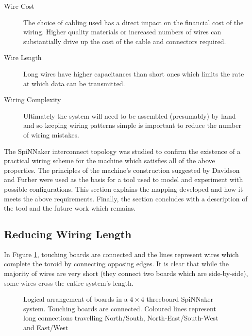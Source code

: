		\begin{description}
			
			\item[Wire Cost] The choice of cabling used has a direct impact on the
			financial cost of the wiring. Higher quality materials or increased
			numbers of wires can substantially drive up the cost of the cable and
			connectors required.
			
			\item[Wire Length] Long wires have higher capacitances than short ones
			which limits the rate at which data can be transmitted.
			
			\item[Wiring Complexity] Ultimately the system will need to be assembled
			(presumably) by hand and so keeping wiring patterns simple is important to
			reduce the number of wiring mistakes.
			
		\end{description}
		
		The SpiNNaker interconnect topology was studied to confirm the existence of
		a practical wiring scheme for the machine which satisfies all of the above
		properties. The principles of the machine's construction suggested by
		Davidson \cite{davidsonWiring} and Furber \cite{furber13email} were used as
		the basis for a tool used to model and experiment with possible
		configurations. This section explains the mapping developed and how it
		meets the above requirements. Finally, the section concludes with a
		description of the tool and the future work which remains.
		
		\subsection{Reducing Wiring Length}
			
			\label{sec:folding-toroids}
			
			In Figure \ref{fig:boardsLogical},
			touching boards are connected and the lines represent wires which complete
			the toroid by connecting opposing edges. It is clear that while the
			majority of wires are very short (they connect two boards which are
			side-by-side), some wires cross the entire system's length.
			
			\begin{figure}
				\center
				
				\caption[Logical arrangement of boards in a $4\times4$ threeboard
				SpiNNaker system.]{Logical arrangement of boards in a $4\times4$
				threeboard SpiNNaker system. Touching boards are connected. Coloured
				lines represent long connections travelling {\color{red}North/South},
				{\color{green}North-East/South-West} and {\color{blue}East/West}}
				\label{fig:boardsLogical}
			\end{figure}
			
